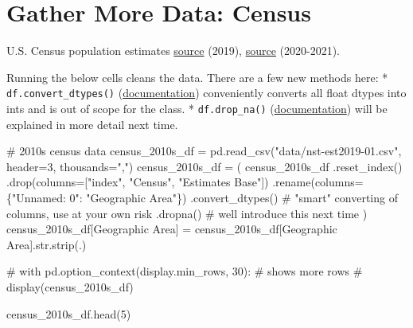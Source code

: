 \documentclass[
  letterpaper,
  DIV=11,
  numbers=noendperiod]{scrreprt}
\newenvironment{Shaded}{\begin{snugshade}}{\end{snugshade}}
\newcommand{\BuiltInTok}[1]{\textcolor[rgb]{0.00,0.23,0.31}{#1}}
\newcommand{\CommentTok}[1]{\textcolor[rgb]{0.37,0.37,0.37}{#1}}
\newcommand{\DecValTok}[1]{\textcolor[rgb]{0.68,0.00,0.00}{#1}}
\newcommand{\NormalTok}[1]{\textcolor[rgb]{0.00,0.23,0.31}{#1}}
\newcommand{\OperatorTok}[1]{\textcolor[rgb]{0.37,0.37,0.37}{#1}}
\newcommand{\StringTok}[1]{\textcolor[rgb]{0.13,0.47,0.30}{#1}}
\begin{document}
\hypertarget{gather-more-data-census}{%
\section{Gather More Data: Census}\label{gather-more-data-census}}

U.S. Census population estimates
\href{https://www.census.gov/data/tables/time-series/demo/popest/2010s-state-total.html}{source}
(2019),
\href{https://www.census.gov/data/tables/time-series/demo/popest/2020s-state-total.html}{source}
(2020-2021).

Running the below cells cleans the data. There are a few new methods
here: * \texttt{df.convert\_dtypes()}
(\href{https://pandas.pydata.org/docs/reference/api/pandas.DataFrame.convert_dtypes.html}{documentation})
conveniently converts all float dtypes into ints and is out of scope for
the class. * \texttt{df.drop\_na()}
(\href{https://pandas.pydata.org/docs/reference/api/pandas.DataFrame.dropna.html}{documentation})
will be explained in more detail next time.

\begin{Shaded}
\begin{Highlighting}[]
\CommentTok{\# 2010s census data}
\NormalTok{census\_2010s\_df }\OperatorTok{=}\NormalTok{ pd.read\_csv(}\StringTok{"data/nst{-}est2019{-}01.csv"}\NormalTok{, header}\OperatorTok{=}\DecValTok{3}\NormalTok{, thousands}\OperatorTok{=}\StringTok{","}\NormalTok{)}
\NormalTok{census\_2010s\_df }\OperatorTok{=}\NormalTok{ (}
\NormalTok{    census\_2010s\_df}
\NormalTok{    .reset\_index()}
\NormalTok{    .drop(columns}\OperatorTok{=}\NormalTok{[}\StringTok{"index"}\NormalTok{, }\StringTok{"Census"}\NormalTok{, }\StringTok{"Estimates Base"}\NormalTok{])}
\NormalTok{    .rename(columns}\OperatorTok{=}\NormalTok{\{}\StringTok{"Unnamed: 0"}\NormalTok{: }\StringTok{"Geographic Area"}\NormalTok{\})}
\NormalTok{    .convert\_dtypes()                 }\CommentTok{\# "smart" converting of columns, use at your own risk}
\NormalTok{    .dropna()                         }\CommentTok{\# we\textquotesingle{}ll introduce this next time}
\NormalTok{)}
\NormalTok{census\_2010s\_df[}\StringTok{\textquotesingle{}Geographic Area\textquotesingle{}}\NormalTok{] }\OperatorTok{=}\NormalTok{ census\_2010s\_df[}\StringTok{\textquotesingle{}Geographic Area\textquotesingle{}}\NormalTok{].}\BuiltInTok{str}\NormalTok{.strip(}\StringTok{\textquotesingle{}.\textquotesingle{}}\NormalTok{)}

\CommentTok{\# with pd.option\_context(\textquotesingle{}display.min\_rows\textquotesingle{}, 30): \# shows more rows}
\CommentTok{\#     display(census\_2010s\_df)}
    
\NormalTok{census\_2010s\_df.head(}\DecValTok{5}\NormalTok{)}
\end{Highlighting}
\end{Shaded}
\end{document}
